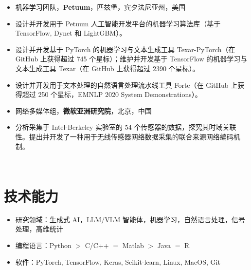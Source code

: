 \documentclass{resume}
\begin{document}
\begin{itemize}
\item[] 机器学习团队，\textbf{Petuum}，匹兹堡，宾夕法尼亚州，美国
\item 设计并开发用于 Petuum 人工智能开发平台的机器学习算法库（基于 TensorFlow, Dynet 和 LightGBM）。
\item 设计并开发基于 PyTorch 的机器学习与文本生成工具 Texar-PyTorch（在 GitHub 上获得超过 745 个星标）；维护并开发基于 TensorFlow 的机器学习与文本生成工具 Texar（在 GitHub 上获得超过 2390 个星标）。
\item 设计并开发用于文本处理的自然语言处理流水线工具 Forte（在 GitHub 上获得超过 250 个星标，EMNLP 2020 System Demonstrations）。
\end{itemize}

\begin{itemize}
\item[] 网络多媒体组，\textbf{微软亚洲研究院}，北京，中国
\item 分析采集于 Intel-Berkeley 实验室的 54 个传感器的数据，探究其时域关联性。提出并开发了一种用于无线传感器网络数据采集的联合来源网络编码机制。
\end{itemize}

\

\section{技术能力}
\begin{itemize}[parsep=0.2ex]
\item 研究领域：生成式 AI，LLM/VLM 智能体，机器学习，自然语言处理，信号处理，高维统计
\item 编程语言：Python $>$ C/C++ $=$ Matlab $>$ Java $=$ R
\item 软件：PyTorch, TensorFlow, Keras, Scikit-learn, Linux, MacOS, Git
\end{itemize}

\
\end{document}

